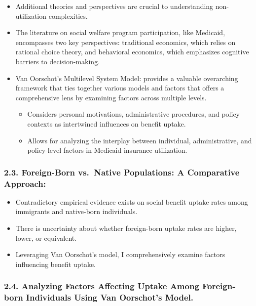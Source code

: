 \documentclass[
]{article}
\providecommand{\tightlist}{%
  \setlength{\itemsep}{0pt}\setlength{\parskip}{0pt}}
\begin{document}
\begin{itemize}
\tightlist
\item
  Additional theories and perspectives are crucial to understanding
  non-utilization complexities.
\item
  The literature on social welfare program participation, like Medicaid,
  encompasses two key perspectives: traditional economics, which relies
  on rational choice theory, and behavioral economics, which emphasizes
  cognitive barriers to decision-making.
\item
  Van Oorschot's Multilevel System Model: provides a valuable
  overarching framework that ties together various models and factors
  that offers a comprehensive lens by examining factors across multiple
  levels.

  \begin{itemize}
  \tightlist
  \item
    Considers personal motivations, administrative procedures, and
    policy contexts as intertwined influences on benefit uptake.
  \item
    Allows for analyzing the interplay between individual,
    administrative, and policy-level factors in Medicaid insurance
    utilization.
  \end{itemize}
\end{itemize}

\hypertarget{foreign-born-vs.-native-populations-a-comparative-approach}{%
\subsubsection{2.3. Foreign-Born vs.~Native Populations: A Comparative
Approach:}\label{foreign-born-vs.-native-populations-a-comparative-approach}}

\begin{itemize}
\tightlist
\item
  Contradictory empirical evidence exists on social benefit uptake rates
  among immigrants and native-born individuals.
\item
  There is uncertainty about whether foreign-born uptake rates are
  higher, lower, or equivalent.
\item
  Leveraging Van Oorschot's model, I comprehensively examine factors
  influencing benefit uptake.
\end{itemize}

\hypertarget{analyzing-factors-affecting-uptake-among-foreign-born-individuals-using-van-oorschots-model.}{%
\subsubsection{2.4. Analyzing Factors Affecting Uptake Among
Foreign-born Individuals Using Van Oorschot's
Model.}\label{analyzing-factors-affecting-uptake-among-foreign-born-individuals-using-van-oorschots-model.}}
\end{document}
